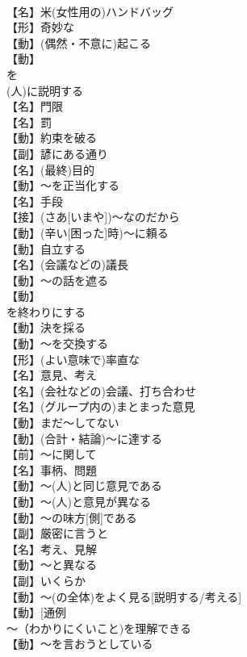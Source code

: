 \documentclass[8pt]{extreport}
\begin{document}
\begin{CJK}{UTF8}{min}
\\	【名】{米}(女性用の)ハンドバッグ
\\	【形】奇妙な
\\	【動】(偶然・不意に)起こる
\\	【動】
\\	を
\\	(人)に説明する
\\	【名】門限
\\	【名】罰
\\	【動】約束を破る
\\	【副】諺にある通り
\\	【名】(最終)目的
\\	【動】～を正当化する
\\	【名】手段
\\	【接】(さあ[いまや])～なのだから
\\	【動】(辛い[困った]時)～に頼る
\\	【動】自立する
\\	【名】(会議などの)議長
\\	【動】～の話を遮る
\\	【動】
\\	を終わりにする
\\	【動】決を採る
\\	【動】～を交換する
\\	【形】(よい意味で)率直な
\\	【名】意見、考え
\\	【名】(会社などの)会議、打ち合わせ
\\	【名】(グループ内の)まとまった意見
\\	【動】まだ～してない
\\	【動】(合計・結論)～に達する
\\	【前】～に関して
\\	【名】事柄、問題
\\	【動】～(人)と同じ意見である
\\	【動】～(人)と意見が異なる
\\	【動】～の味方[側]である
\\	【副】厳密に言うと
\\	【名】考え、見解
\\	【動】～と異なる
\\	【副】いくらか
\\	【動】～(の全体)をよく見る[説明する/考える]
\\	【動】[通例 
\\	～（わかりにくいこと)を理解できる
\\	【動】～を言おうとしている

\end{CJK}
\end{document}
